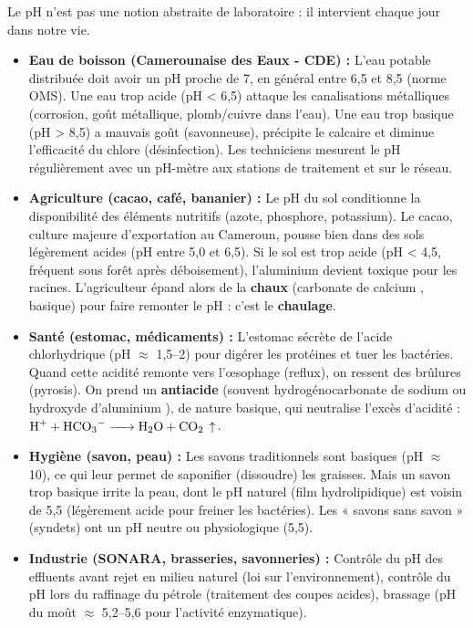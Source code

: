 \documentclass[11pt]{article}
\newcounter{popsec}
\newcounter{popsub}
\newcommand{\courssub}[1]{%
  \stepcounter{popsub}%
  \par\vspace{9pt}\noindent{\popxbold\fontsize{11.5}{13}\selectfont\color{popink}{\color{poporange}\thepopsec.\thepopsub}\hspace{6pt}#1}\par\nopagebreak\vspace{4pt}
}
\begin{document}
\courssub{Importance pratique du pH}

Le pH n'est pas une notion abstraite de laboratoire : il intervient chaque jour dans notre vie.

\begin{itemize}
\item \textbf{Eau de boisson (Camerounaise des Eaux - CDE) :} L'eau potable distribuée doit avoir un pH proche de 7, en général entre 6,5 et 8,5 (norme OMS). Une eau trop acide (pH < 6,5) attaque les canalisations métalliques (corrosion, goût métallique, plomb/cuivre dans l'eau). Une eau trop basique (pH > 8,5) a mauvais goût (savonneuse), précipite le calcaire et diminue l'efficacité du chlore (désinfection). Les techniciens mesurent le pH régulièrement avec un pH-mètre aux stations de traitement et sur le réseau.
\item \textbf{Agriculture (cacao, café, bananier) :} Le pH du sol conditionne la disponibilité des éléments nutritifs (azote, phosphore, potassium). Le cacao, culture majeure d'exportation au Cameroun, pousse bien dans des sols légèrement acides (pH entre 5,0 et 6,5). Si le sol est trop acide (pH < 4,5, fréquent sous forêt après déboisement), l'aluminium devient toxique pour les racines. L'agriculteur épand alors de la \textbf{chaux} (carbonate de calcium , basique) pour faire remonter le pH : c'est le \textbf{chaulage}.
\item \textbf{Santé (estomac, médicaments) :} L'estomac sécrète de l'acide chlorhydrique (pH $\approx$ 1,5--2) pour digérer les protéines et tuer les bactéries. Quand cette acidité remonte vers l'œsophage (reflux), on ressent des brûlures (pyrosis). On prend un \textbf{antiacide} (souvent hydrogénocarbonate de sodium  ou hydroxyde d'aluminium ), de nature basique, qui neutralise l'excès d'acidité : $\ce{H+ + HCO3- -> H2O + CO2}\,\uparrow$.
\item \textbf{Hygiène (savon, peau) :} Les savons traditionnels sont basiques (pH $\approx$ 10), ce qui leur permet de saponifier (dissoudre) les graisses. Mais un savon trop basique irrite la peau, dont le pH naturel (film hydrolipidique) est voisin de 5,5 (légèrement acide pour freiner les bactéries). Les « savons sans savon » (syndets) ont un pH neutre ou physiologique (5,5).
\item \textbf{Industrie (SONARA, brasseries, savonneries) :} Contrôle du pH des effluents avant rejet en milieu naturel (loi sur l'environnement), contrôle du pH lors du raffinage du pétrole (traitement des coupes acides), brassage (pH du moût $\approx$ 5,2--5,6 pour l'activité enzymatique).
\end{itemize}
\end{document}
